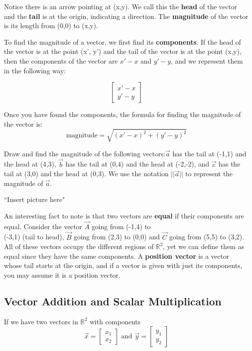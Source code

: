 Notice there is an arrow pointing at (x,y). We call this the \textbf{head} of the vector and the \textbf{tail} is at the origin, indicating a direction. The \textbf{magnitude} of the vector is its length from (0,0) to (x,y). 


\newpage

To find the magnitude of a vector, we first find its \textbf{components}. If the head of the vector is at the point (x', y') and the tail of the vector is at the point (x,y), then the components of the vector are $x'-x$ and $y'-y$, and we represent them in the following way:

$$ \begin{bmatrix}x'-x\\y'-y\end{bmatrix} $$

Once you have found the components, the formula for finding the magnitude of the vector is:
$$\text{magnitude} = \sqrt{(x'-x)^2 + (y'-y)^2} $$ 

\newpage

Draw and find the magnitude of the following vectors:$ \overrightarrow{a}$ has the tail at (-1,1) and the head at (4,3), $\overrightarrow{b}$ has the tail at (0,4) and the head at (-2,-2), and $\overrightarrow{c}$ has the tail at (3,0) and the head at (0,3). We use the notation $||\overrightarrow{a}||$ to represent the magnitude of $\overrightarrow{a}$.

``Insert picture here"

\newpage

An interesting fact to note is that two vectors are \textbf{equal} if their components are equal. Consider the vector $\overrightarrow{A}$ going from (-1,4) to \\ \noindent (-3,1) (tail to head), $\overrightarrow{B}$ going from (2,3) to (0,0) and $\overrightarrow{C}$ going from (5,5) to (3,2). All of these vectors occupy the different regions of $\mathbb{R}^2$, yet we can define them as equal since they have the same components. A \textbf{position vector} is a vector whose tail starts at the origin, and if a vector is given with just its components, you may assume it is a position vector.
\newpage
\subsection*{Vector Addition and Scalar Multiplication}


If we have two vectors in $\mathbb{R}^2$ with components
$$ \overrightarrow{x} = \begin{bmatrix}x_1\\x_2\end{bmatrix} \text{ and } \overrightarrow{y} = \begin{bmatrix}y_1\\y_2\end{bmatrix}$$

